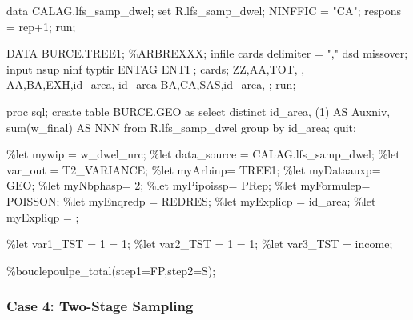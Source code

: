 \documentclass[
]{article}
\newenvironment{Shaded}{\begin{snugshade}}{\end{snugshade}}
\newcommand{\NormalTok}[1]{#1}
\begin{document}
\begin{Shaded}
\begin{Highlighting}[]
\NormalTok{data CALAG.lfs\_samp\_dwel; set R.lfs\_samp\_dwel; }
\NormalTok{NINFFIC = "CA";}
\NormalTok{respons = rep+1;}
\NormalTok{run;}

\NormalTok{DATA BURCE.TREE1;   }
\NormalTok{\%ARBREXXX;}
\NormalTok{infile cards delimiter = "," dsd missover;}
\NormalTok{input nsup ninf typtir ENTAG ENTI ;}
\NormalTok{cards;   }
\NormalTok{ZZ,AA,TOT, ,   }
\NormalTok{AA,BA,EXH,id\_area, id\_area}
\NormalTok{BA,CA,SAS,id\_area,}
\NormalTok{;}
\NormalTok{run;}

\NormalTok{proc sql;}
\NormalTok{create table BURCE.GEO as select distinct}
\NormalTok{    id\_area, (1) AS Auxniv, sum(w\_final) AS NNN}
\NormalTok{from R.lfs\_samp\_dwel group by id\_area;}
\NormalTok{quit;}

\NormalTok{\%let mywip = w\_dwel\_nrc;}
\NormalTok{\%let data\_source = CALAG.lfs\_samp\_dwel;}
\NormalTok{\%let var\_out = T2\_VARIANCE;}
\NormalTok{\%let myArbinp=  TREE1;}
\NormalTok{\%let myDataauxp= GEO;}
\NormalTok{\%let myNbphasp=  2;}
\NormalTok{\%let myPipoissp= PRep;}
\NormalTok{\%let myFormulep= POISSON;}
\NormalTok{\%let myEnqredp = REDRES;}
\NormalTok{\%let myExplicp = id\_area;}
\NormalTok{\%let myExpliqp = ;}

\NormalTok{\%let var1\_TST = 1 = 1;}
\NormalTok{\%let var2\_TST = 1 = 1;}
\NormalTok{\%let var3\_TST = income;}

\NormalTok{\%bouclepoulpe\_total(step1=FP,step2=S);}
\end{Highlighting}
\end{Shaded}

\subsubsection{Case 4: Two-Stage
Sampling}\label{case-4-two-stage-sampling-1}
\end{document}
